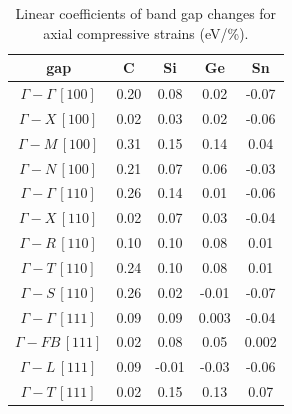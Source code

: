 \begin{table}[!htbp]
    \centering
    \caption{Linear coefficients of band gap changes for axial compressive strains (eV/\%).}
    \begin{tabular}{|c|c|c|c|c|}
        \hline
        gap          & C & Si & Ge & Sn \\ \hline
        $\Gamma-\Gamma\,[100]$ & 0.20  & 0.08  & 0.02  & -0.07 \\ \hline
        $\Gamma-X\,[100]$ & 0.02 & 0.03  & 0.02 & -0.06 \\ \hline
        $\Gamma-M\,[100]$ & 0.31 & 0.15  & 0.14 & 0.04 \\ \hline
        $\Gamma-N\,[100]$ & 0.21 &  0.07  & 0.06 & -0.03 \\ \hline
        $\Gamma-\Gamma\,[110]$ & 0.26 & 0.14 & 0.01 & -0.06 \\ \hline
        $\Gamma-X\,[110]$  & 0.02  & 0.07 & 0.03 & -0.04 \\ \hline
        $\Gamma-R\,[110]$  & 0.10 & 0.10 & 0.08 & 0.01 \\ \hline
        $\Gamma-T\,[110]$  & 0.24 & 0.10 & 0.08 & 0.01 \\ \hline
        $\Gamma-S\,[110]$  & 0.26 & 0.02 & -0.01 & -0.07 \\ \hline
        $\Gamma-\Gamma\,[111]$  & 0.09 & 0.09 & 0.003 & -0.04 \\ \hline
        $\Gamma-FB\,[111]$ & 0.02 & 0.08 & 0.05 & 0.002 \\ \hline
        $\Gamma-L\,[111]$  & 0.09 & -0.01 & -0.03 & -0.06 \\ \hline
        $\Gamma-T\,[111]$  & 0.02 & 0.15 & 0.13 & 0.07 \\ \hline
    \end{tabular}
    \label{Tab:strain_gap_uni_compressive}
\end{table}

